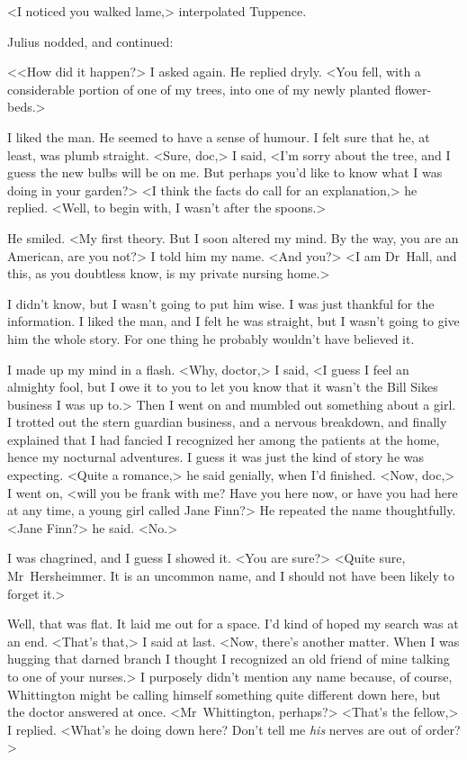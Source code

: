 <I noticed you walked lame,> interpolated Tuppence.

Julius nodded, and continued:

<<How did it happen?> I asked again. He replied dryly. <You fell, with a considerable portion of one of my trees, into one of my newly planted flower-beds.>

I liked the man. He seemed to have a sense of humour. I felt sure that he, at least, was plumb straight. <Sure, doc,> I said, <I'm sorry about the tree, and I guess the new bulbs will be on me. But perhaps you'd like to know what I was doing in your garden?> <I think the facts do call for an explanation,> he replied. <Well, to begin with, I wasn't after the spoons.>

He smiled. <My first theory. But I soon altered my mind. By the way, you are an American, are you not?> I told him my name. <And you?> <I am Dr~Hall, and this, as you doubtless know, is my private nursing home.>

I didn't know, but I wasn't going to put him wise. I was just thankful for the information. I liked the man, and I felt he was straight, but I wasn't going to give him the whole story. For one thing he probably wouldn't have believed it.

I made up my mind in a flash. <Why, doctor,> I said, <I guess I feel an almighty fool, but I owe it to you to let you know that it wasn't the Bill Sikes business I was up to.> Then I went on and mumbled out something about a girl. I trotted out the stern guardian business, and a nervous breakdown, and finally explained that I had fancied I recognized her among the patients at the home, hence my nocturnal adventures. I guess it was just the kind of story he was expecting. <Quite a romance,> he said genially, when I'd finished. <Now, doc,> I went on, <will you be frank with me? Have you here now, or have you had here at any time, a young girl called Jane Finn?> He repeated the name thoughtfully. <Jane Finn?> he said. <No.>

I was chagrined, and I guess I showed it. <You are sure?> <Quite sure, Mr~Hersheimmer. It is an uncommon name, and I should not have been likely to forget it.>

Well, that was flat. It laid me out for a space. I'd kind of hoped my search was at an end. <That's that,> I said at last. <Now, there's another matter. When I was hugging that darned branch I thought I recognized an old friend of mine talking to one of your nurses.> I purposely didn't mention any name because, of course, Whittington might be calling himself something quite different down here, but the doctor answered at once. <Mr~Whittington, perhaps?> <That's the fellow,> I replied. <What's he doing down here? Don't tell me \emph{his} nerves are out of order?>

